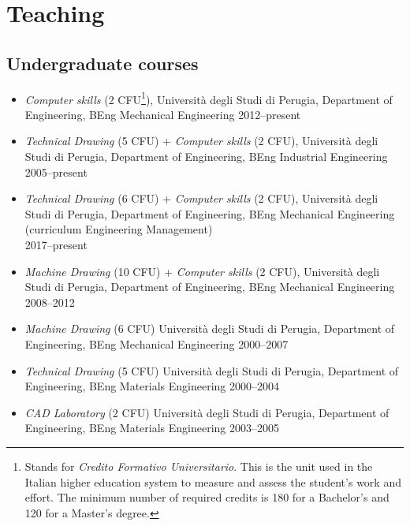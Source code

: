 \documentclass[11pt]{article}
\begin{document}
\section*{Teaching}

\subsection*{Undergraduate courses}

\begin{itemize}
	\item \emph{Computer skills} (2 CFU\footnote{Stands for \emph{Credito Formativo Universitario}. This is the unit used in the Italian higher education system to measure and assess the student's work and effort. The minimum number of required credits is 180 for a Bachelor's and 120 for a Master's degree.}), Università degli Studi di Perugia, Department of Engineering, BEng Mechanical Engineering \mbox{} \hfill 2012--present
	
	\item \emph{Technical Drawing} (5 CFU) + \emph{Computer skills} (2 CFU), Università degli Studi di Perugia, Department of Engineering, BEng Industrial Engineering \mbox{} \hfill 2005--present

	\item \emph{Technical Drawing} (6 CFU) + \emph{Computer skills} (2 CFU), Università degli Studi di Perugia, Department of Engineering, BEng Mechanical Engineering (curriculum Engineering Management) \\ \mbox{} \hfill 2017--present
	
	\item \emph{Machine Drawing} (10 CFU) + \emph{Computer skills} (2 CFU), Università degli Studi di Perugia, Department of Engineering, BEng Mechanical Engineering \mbox{} \hfill 2008--2012
  
	\item \emph{Machine Drawing} (6 CFU) Università degli Studi di Perugia, Department of Engineering, BEng Mechanical Engineering \mbox{} \hfill 2000--2007
  \item \emph{Technical Drawing} (5 CFU) Università degli Studi di Perugia, Department of Engineering, BEng Materials Engineering \mbox{} \hfill 2000--2004
 
 \item \emph{CAD Laboratory} (2 CFU) Università degli Studi di Perugia, Department of Engineering, BEng Materials Engineering \mbox{} \hfill 2003–2005
\end{itemize}
\end{document}
